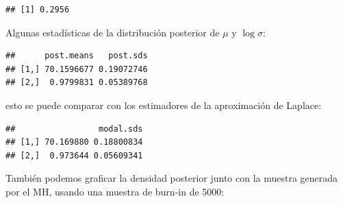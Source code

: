 \documentclass[
  12pt,
]{book}
\newenvironment{Shaded}{\begin{snugshade}}{\end{snugshade}}
\newcommand{\AttributeTok}[1]{\textcolor[rgb]{0.77,0.63,0.00}{#1}}
\newcommand{\DecValTok}[1]{\textcolor[rgb]{0.00,0.00,0.81}{#1}}
\newcommand{\FloatTok}[1]{\textcolor[rgb]{0.00,0.00,0.81}{#1}}
\newcommand{\FunctionTok}[1]{\textcolor[rgb]{0.00,0.00,0.00}{#1}}
\newcommand{\NormalTok}[1]{#1}
\newcommand{\OtherTok}[1]{\textcolor[rgb]{0.56,0.35,0.01}{#1}}
\newcommand{\SpecialCharTok}[1]{\textcolor[rgb]{0.00,0.00,0.00}{#1}}
\newcommand{\StringTok}[1]{\textcolor[rgb]{0.31,0.60,0.02}{#1}}
\theoremstyle{definition}
\theoremstyle{definition}
\theoremstyle{definition}
\theoremstyle{definition}
\theoremstyle{remark}
\begin{document}
\begin{verbatim}
## [1] 0.2956
\end{verbatim}

Algunas estadísticas de la distribución posterior de \(\mu\) y \(\log \sigma\):

\begin{Shaded}
\end{Shaded}

\begin{verbatim}
##      post.means   post.sds
## [1,] 70.1596677 0.19072746
## [2,]  0.9799831 0.05389768
\end{verbatim}

esto se puede comparar con los estimadores de la aproximación de Laplace:

\begin{Shaded}
\end{Shaded}

\begin{verbatim}
##                 modal.sds
## [1,] 70.169880 0.18800834
## [2,]  0.973644 0.05609341
\end{verbatim}

También podemos graficar la densidad posterior junto con la muestra generada por el MH, usando una muestra de burn-in de 5000:

\begin{Shaded}
\end{Shaded}
\end{document}
